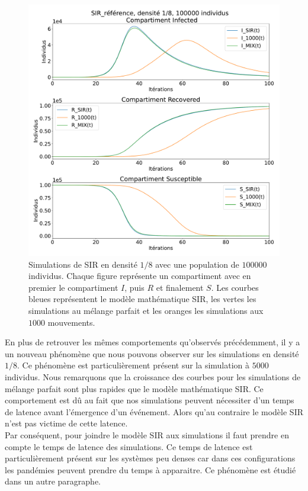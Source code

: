 \begin{figure}[h]
	\centering
	\captionsetup{justification=centering}
	\includegraphics[width=.9\textwidth]{Images/SIR_ref_8_100.pdf}
	\caption[Simulation SIR, densité $1/8$]{Simulations de SIR en densité $1/8$ avec une population de $100000$ individus. Chaque figure représente un compartiment avec en premier le compartiment $I$, puis $R$ et finalement $S$. Les courbes bleues représentent le modèle mathématique SIR, les vertes les simulations au mélange parfait et les oranges les simulations aux $1000$ mouvements.}
\end{figure}

En plus de retrouver les mêmes comportements qu'observés précédemment, il y a un nouveau phénomène que nous pouvons observer sur les simulations en densité $1/8$. Ce phénomène est particulièrement présent sur la simulation à $5000$ individus. Nous remarquons que la croissance des courbes pour les simulations de mélange parfait sont plus rapides que le modèle mathématique SIR. Ce comportement est dû au fait que nos simulations peuvent nécessiter d'un temps de latence avant l'émergence d'un événement. Alors qu'au contraire le modèle SIR n'est pas victime de cette latence.\\

Par conséquent, pour joindre le modèle SIR aux simulations il faut prendre en compte le temps de latence des simulations. Ce temps de latence est particulièrement présent sur les systèmes peu denses car dans ces configurations les pandémies peuvent prendre du temps à apparaitre. Ce phénomène est étudié dans un autre paragraphe.

